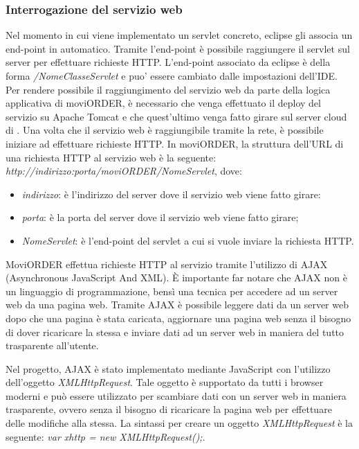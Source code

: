 \subsubsection{Interrogazione del servizio web}

Nel momento in cui viene implementato un servlet concreto, eclipse gli associa un end-point in automatico. Tramite l'end-point è possibile raggiungere il servlet sul server per effettuare richieste HTTP. L'end-point associato da eclipse è della forma \textit{/NomeClasseServlet} e puo' essere cambiato dalle impostazioni dell'IDE. Per rendere possibile il raggiungimento del servizio web da parte della logica applicativa di moviORDER, è necessario che venga effettuato il deploy del servizio su Apache Tomcat e che quest'ultimo venga fatto girare sul server cloud di \visione{}. Una volta che il servizio web è raggiungibile tramite la rete, è possibile iniziare ad effettuare richieste HTTP. In moviORDER, la struttura dell'URL di una richiesta HTTP al servizio web è la seguente: \textit{http://indirizzo:porta/moviORDER/NomeServlet}, dove:
\begin{itemize}
	\item \textit{indirizzo}: è l'indirizzo del server dove il servizio web viene fatto girare:
	\item \textit{porta}: è la porta del server dove il servizio web viene fatto girare;
	\item \textit{NomeServlet}: è l'end-point del servlet a cui si vuole inviare la richiesta HTTP.
\end{itemize}

MoviORDER effettua richieste HTTP al servizio tramite l'utilizzo di AJAX (Asynchronous JavaScript And XML). È importante far notare che AJAX non è un linguaggio di programmazione, bensì una tecnica per accedere ad un server web da una pagina web. Tramite AJAX è possibile leggere dati da un server web dopo che una pagina è stata caricata, aggiornare una pagina web senza il bisogno di dover ricaricare la stessa e inviare dati ad un server web in maniera del tutto trasparente all'utente. 

Nel progetto, AJAX è stato implementato mediante JavaScript con l'utilizzo dell'oggetto \textit{XMLHttpRequest}. Tale oggetto è supportato da tutti i browser moderni e può essere utilizzato per scambiare dati con un server web in maniera trasparente, ovvero senza il bisogno di ricaricare la pagina web per effettuare delle modifiche alla stessa. La sintassi per creare un oggetto \textit{XMLHttpRequest} è la seguente:
\textit{var xhttp = new XMLHttpRequest();}. 

